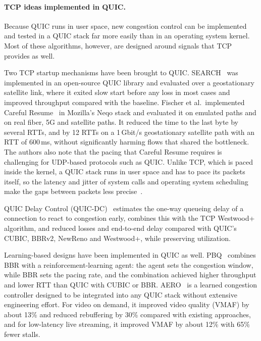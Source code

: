 \paragraph{TCP ideas implemented in QUIC.}  Because QUIC runs in user space, new congestion control can be
implemented and tested in a QUIC stack far more easily than in an operating system
kernel. Most of these algorithms, however, are
designed around signals that TCP provides as well.

Two TCP startup mechanisms have been brought to QUIC.
SEARCH~\cite{cronin2024search} was implemented in an open-source QUIC library and evaluated over a geostationary satellite link, where it exited
slow start before any loss in most cases and improved throughput compared with the
baseline. Fischer et al.\ implemented Careful Resume~\cite{fischer2025neqo} in Mozilla's
Neqo stack and evaluated it on emulated paths and on real fiber, 5G and satellite
paths. It reduced the time to the last byte by several RTTs, and by 12 RTTs on a
1\,Gbit/s geostationary satellite path with an RTT of 600\,ms, without significantly
harming flows that shared the bottleneck. The authors also note that the pacing that
Careful Resume requires is challenging for UDP-based protocols such as QUIC. Unlike
TCP, which is paced inside the kernel, a QUIC stack runs in user space and has to pace
its packets itself, so the latency and jitter of system calls and operating system
scheduling make the gaps between packets less precise~\cite{kempf2025quicsteps}.

QUIC Delay Control (QUIC-DC)~\cite{mascolo2025quicdc}
estimates the one-way queueing delay of a connection to react to congestion early,
combines this with the TCP Westwood+~\cite{mascolo2001westwood} algorithm, and reduced losses and end-to-end delay compared with QUIC's CUBIC, BBRv2, NewReno and Westwood+, while preserving utilization.

Learning-based designs have been implemented in QUIC as well. PBQ~\cite{zhang2023pbq} combines BBR
with a reinforcement-learning agent: the agent sets the congestion window, while BBR
sets the pacing rate, and the combination achieved higher throughput and lower RTT
than QUIC with CUBIC or BBR. AERO~\cite{sidhu2026aero} is a learned congestion
controller designed to be integrated into any QUIC stack without extensive engineering
effort. For video on demand, it improved video quality (VMAF) by about 13\% and reduced
rebuffering by 30\% compared with existing approaches, and for low-latency live
streaming, it improved VMAF by about 12\% with 65\% fewer stalls.

